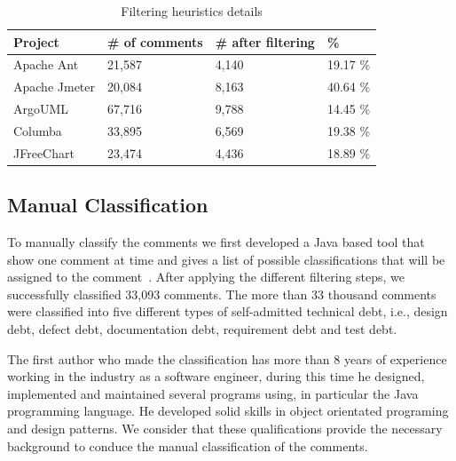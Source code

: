 \begin{table}[!hbt]
      \begin{center}
            \caption{Filtering heuristics details}
            \label{tab:filtering_heuristics_details}
            \begin{tabular}{l| l l p{1in} }
            \toprule
            \textbf{Project}   & \textbf{\# of comments}  & \textbf{\# after filtering} & \textbf{\%}\\ \midrule 
              Apache Ant       & 21,587                & 4,140                   & 19.17 \% \\ 
              Apache Jmeter    & 20,084                & 8,163                   & 40.64 \% \\
              ArgoUML          & 67,716                & 9,788                   & 14.45 \% \\              
              Columba          & 33,895                & 6,569                   & 19.38 \% \\
              JFreeChart       & 23,474                & 4,436                   & 18.89 \% \\ \bottomrule
            \end{tabular}
      \end{center}
\end{table}

\subsection{Manual Classification} %
\label{sub:manual_classification}

To manually classify the comments we first developed a Java based tool that show one comment at time and gives a list of possible classifications  that will be assigned to the comment~\cite{Alves2014MTD}. After applying the different filtering steps, we successfully classified 33,093 comments. The more than 33 thousand comments were classified into five different types of self-admitted technical debt, i.e., design debt, defect debt, documentation debt, requirement debt and test debt.

The first author who made the classification has more than 8 years of experience working in the industry as a software engineer, during this time he designed, implemented and maintained several programs using, in particular the Java programming language. He developed solid skills in object orientated programing and design patterns. We consider that these qualifications provide the necessary background to conduce the manual classification of the comments.   
